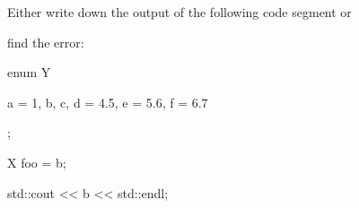 Either write down the output of the following code segment or

find the error:



\begin{consolethree}[escapeinside=||]

enum Y

{

    a = 1, b, c, d = 4.5, e = 5.6, f = 6.7

};



X foo = b;

std::cout << b << std::endl;

\end{consolethree}

